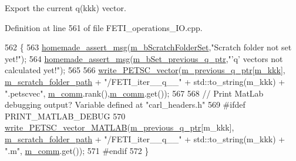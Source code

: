 Export the current {\ttfamily q(kkk)} vector. 



Definition at line 561 of file F\+E\+T\+I\+\_\+operations\+\_\+\+I\+O.\+cpp.


\begin{DoxyCode}
562 \{
563     \hyperlink{common__header_8h_a593ccc80b790b2268653fcf6597bf451}{homemade\_assert\_msg}(\hyperlink{classcarl_1_1_f_e_t_i___operations_a8bb9de7de35a2f7d7d5982ae1085ba15}{m\_bScratchFolderSet},\textcolor{stringliteral}{"Scratch folder not set
       yet!"});
564     \hyperlink{common__header_8h_a593ccc80b790b2268653fcf6597bf451}{homemade\_assert\_msg}(\hyperlink{classcarl_1_1_f_e_t_i___operations_a9bacd2df5ed75055635acc7336c96bef}{m\_bSet\_previous\_q\_ptr},\textcolor{stringliteral}{"'q' vectors not
       calculated yet!"});
565 
566     \hyperlink{namespacecarl_a1632084ec1f296b63559648cc9c2047f}{write\_PETSC\_vector}(\hyperlink{classcarl_1_1_f_e_t_i___operations_a7ff19f8422276b403c971d31611945c5}{m\_previous\_q\_ptr}[\hyperlink{classcarl_1_1_f_e_t_i___operations_aae9d8e6d2d0436cda061359f1602b096}{m\_kkk}],
      \hyperlink{classcarl_1_1_f_e_t_i___operations_ad6d35bc9b5221d45452fbc8931f22055}{m\_scratch\_folder\_path} + \textcolor{stringliteral}{"/FETI\_iter\_\_q\_\_"} + std::to\_string(m\_kkk) + \textcolor{stringliteral}{".petscvec"},
      \hyperlink{classcarl_1_1_f_e_t_i___operations_a8cb0ed286667fc9f3ebc2d8ef2a3e13b}{m\_comm}.rank(),\hyperlink{classcarl_1_1_f_e_t_i___operations_a8cb0ed286667fc9f3ebc2d8ef2a3e13b}{m\_comm}.get());
567 
568 \textcolor{comment}{// Print MatLab debugging output? Variable defined at "carl\_headers.h"}
569 \textcolor{preprocessor}{#ifdef PRINT\_MATLAB\_DEBUG}
570     \hyperlink{namespacecarl_a25d36e4c1615382a1832d73c716599db}{write\_PETSC\_vector\_MATLAB}(\hyperlink{classcarl_1_1_f_e_t_i___operations_a7ff19f8422276b403c971d31611945c5}{m\_previous\_q\_ptr}[m\_kkk],
      \hyperlink{classcarl_1_1_f_e_t_i___operations_ad6d35bc9b5221d45452fbc8931f22055}{m\_scratch\_folder\_path} + \textcolor{stringliteral}{"/FETI\_iter\_\_q\_\_"} + std::to\_string(m\_kkk) + \textcolor{stringliteral}{".m"},
      \hyperlink{classcarl_1_1_f_e_t_i___operations_a8cb0ed286667fc9f3ebc2d8ef2a3e13b}{m\_comm}.get());
571 \textcolor{preprocessor}{#endif}
572 \}
\end{DoxyCode}
\hypertarget{classcarl_1_1_f_e_t_i___operations_abfd402a785f614ea48a8b6862f34ab17}{}

